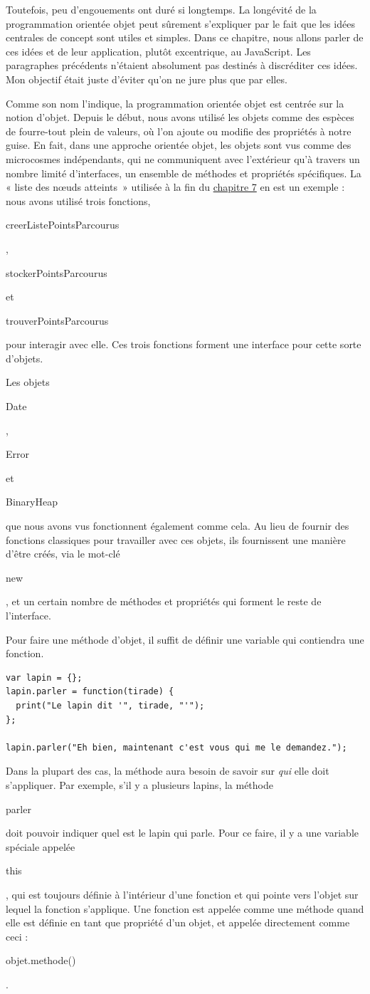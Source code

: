 \documentclass{FramateX}
\renewcommand{\texttt}[1]{\begin{sffamily}{#1}\end{sffamily}}
\begin{document}
Toutefois, peu d'engouements ont duré si longtemps. La longévité de la
programmation orientée objet peut sûrement s'expliquer par le fait que
les idées centrales de concept sont utiles et simples. Dans ce chapitre,
nous allons parler de ces idées et de leur application, plutôt
excentrique, au JavaScript. Les paragraphes précédents n'étaient
absolument pas destinés à discréditer ces idées. Mon objectif était
juste d'éviter qu'on ne jure plus que par elles.

\begin{center}\end{center}

Comme son nom l'indique, la programmation orientée objet est centrée sur
la notion d'objet. Depuis le début, nous avons utilisé les objets comme
des espèces de fourre-tout plein de valeurs, où l'on ajoute ou modifie
des propriétés à notre guise. En fait, dans une approche orientée objet,
les objets sont vus comme des microcosmes indépendants, qui ne
communiquent avec l'extérieur qu'à travers un nombre limité
d'interfaces, un ensemble de méthodes et propriétés spécifiques. La «
liste des nœuds atteints~» utilisée à la fin du
\href{chapter7.html}{chapitre 7} en est un exemple : nous avons utilisé
trois fonctions, \texttt{creerListePointsParcourus},
\texttt{stockerPointsParcourus} et \texttt{trouverPointsParcourus} pour
interagir avec elle. Ces trois fonctions forment une interface pour
cette sorte d'objets.

Les objets \texttt{Date}, \texttt{Error} et \texttt{BinaryHeap} que nous
avons vus fonctionnent également comme cela. Au lieu de fournir des
fonctions classiques pour travailler avec ces objets, ils fournissent
une manière d'être créés, via le mot-clé \texttt{new}, et un certain
nombre de méthodes et propriétés qui forment le reste de l'interface.

\begin{center}\end{center}

Pour faire une méthode d'objet, il suffit de définir une variable qui
contiendra une fonction.

\begin{lstlisting}
var lapin = {};
lapin.parler = function(tirade) {
  print("Le lapin dit '", tirade, "'");
};

lapin.parler("Eh bien, maintenant c'est vous qui me le demandez.");
\end{lstlisting}
Dans la plupart des cas, la méthode aura besoin de savoir sur \emph{qui}
elle doit s'appliquer. Par exemple, s'il y a plusieurs lapins, la
méthode \texttt{parler} doit pouvoir indiquer quel est le lapin qui
parle. Pour ce faire, il y a une variable spéciale appelée
\texttt{this}, qui est toujours définie à l'intérieur d'une fonction et
qui pointe vers l'objet sur lequel la fonction s'applique. Une fonction
est appelée comme une méthode quand elle est définie en tant que
propriété d'un objet, et appelée directement comme ceci :
\texttt{objet.methode()}.
\end{document}
